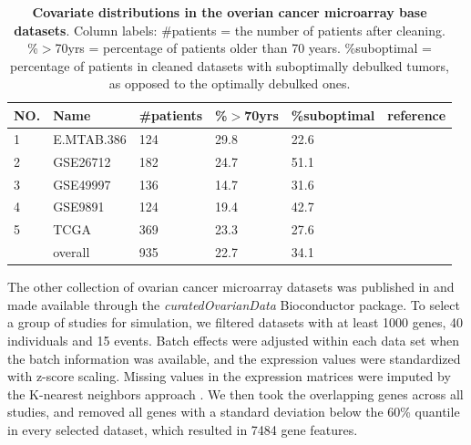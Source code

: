 \documentclass{bioinfo}
\begin{document}
 \begin{table}[!t]
    \begin{tabular*}{1\textwidth}{@{\extracolsep{\fill}}llllll}
      NO. & Name & \#patients & \%$>$70yrs & \%suboptimal & reference\\
      \hline
      1 & E.MTAB.386 & 124 & 29.8 & 22.6  &  \citet{bentink2012angiogenic} \\
       \hline
       2 & GSE26712 & 182 & 24.7 & 51.1 & \citet{bonome2008gene} \\
       \hline
       3 & GSE49997 & 136 & 14.7 & 31.6 & \citet{pils2012validating} \\
       \hline
       4 & GSE9891 & 124 & 19.4 & 42.7  & \citet{tothill2008novel} \\
       \hline
       5 & TCGA & 369 & 23.3 & 27.6 & \citet{cancer2011integrated} \\
       \hline
      \quad & overall & 935 & 22.7 &  34.1 & \\
      \hline
    \end{tabular*}
    \caption{\textbf{Covariate distributions in the overian cancer microarray base datasets}. Column labels:
      \#patients = the number of patients after cleaning. \%$>$70yrs = percentage 
      of patients older than 70 years. \%suboptimal =
      percentage of patients in cleaned datasets with suboptimally debulked tumors, as opposed to the optimally debulked ones.}%
    \label{table-datasets-ovarian}
  \end{table}
  
  
  The other collection of ovarian cancer microarray datasets was published in
  \citet{Ganzfried2013} and made available through the \emph{curatedOvarianData} 
  Bioconductor package. To select a group of studies for simulation, 
  we filtered datasets with at least 1000 genes, 40 individuals and 15 events. Batch effects were
  adjusted within each data set when the batch information was available, 
  and the expression values were standardized with z-score scaling.
  Missing values in the expression matrices 
  were imputed by the K-nearest neighbors approach \citep{KNN}. We then took the overlapping
  genes across all studies, and removed all genes with a standard deviation below 
  the 60\% quantile in every selected dataset, which resulted in 7484 gene features.
 
\end{document}
